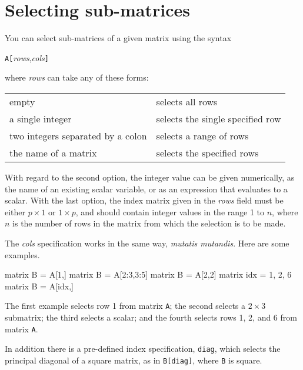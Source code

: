 
\section{Selecting sub-matrices}
\label{matrix-sub}

You can select sub-matrices of a given matrix using the syntax

\texttt{A[}\textsl{rows},\textsl{cols}\texttt{]}

where \textsl{rows} can take any of these forms:

\begin{center}
\begin{tabular}{ll}
empty & selects all rows \\
a single integer & selects the single specified row \\
two integers separated by a colon & selects a range of rows \\
the name of a matrix & selects the specified rows \\
\end{tabular}
\end{center}

With regard to the second option, the integer value can be given
numerically, as the name of an existing scalar variable, or as an
expression that evaluates to a scalar.  With the last option, the
index matrix given in the \textsl{rows} field must be either $p\times
1$ or $1\times p$, and should contain integer values in the range 1 to
$n$, where $n$ is the number of rows in the matrix from which the
selection is to be made.

The \textsl{cols} specification works in the same way, \textit{mutatis
  mutandis}.  Here are some examples.
%
\begin{code}
matrix B = A[1,]
matrix B = A[2:3,3:5]
matrix B = A[2,2]
matrix idx = { 1, 2, 6 }
matrix B = A[idx,]
\end{code}
%
The first example selects row 1 from matrix \texttt{A}; the second
selects a $2\times 3$ submatrix; the third selects a scalar; and
the fourth selects rows 1, 2, and 6 from matrix \texttt{A}.

In addition there is a pre-defined index specification, \texttt{diag},
which selects the principal diagonal of a square matrix, as in
\texttt{B[diag]}, where \texttt{B} is square.

